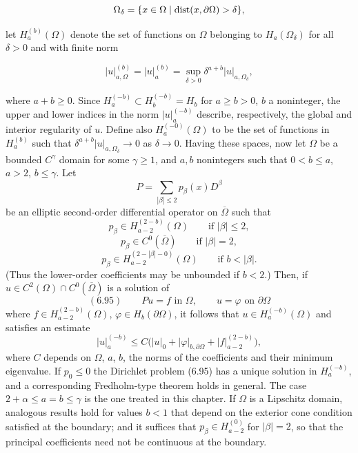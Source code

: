 \[
\Omega_\delta = \{x \in \Omega \mid \operatorname{dist}(x,\partial\Omega) > \delta\},
\]

\noindent let $H_a^{(b)}(\Omega)$ denote the set of functions on $\Omega$ belonging to $H_a(\Omega_\delta)$ for all $\delta > 0$ and with finite norm

\[
|u|_{a,\Omega}^{(b)} = |u|_a^{(b)} = \sup_{\delta>0} \delta^{a+b} |u|_{a,\Omega_\delta},
\]



where $a+b\ge 0$. Since $H_a^{(-b)}\subset H_b^{(-b)}=H_b$ for $a\ge b>0$, $b$ a noninteger, the upper and lower indices in the norm $|u|_a^{(-b)}$ describe, respectively, the global and interior regularity of $u$. Define also $H_a^{(-0)}(\Omega)$ to be the set of functions in $H_a^{(b)}$ such that $\delta^{a+b}|u|_{a,\Omega_\delta}\to 0$ as $\delta\to 0$. Having these spaces, now let $\Omega$ be a bounded $C^\gamma$ domain for some $\gamma\ge 1$, and $a,b$ nonintegers such that $0<b\le a$, $a>2$, $b\le\gamma$.
Let
\[
P=\sum_{|\beta|\le 2} p_\beta(x)D^\beta
\]
be an elliptic second-order differential operator on $\overline{\Omega}$ such that
\[
p_\beta\in H_{a-2}^{(2-b)}(\Omega) \qquad \text{if }|\beta|\le 2,
\]
\[
p_\beta\in C^0(\overline{\Omega}) \qquad \text{if }|\beta|=2,
\]
\[
p_\beta\in H_{a-2}^{(2-|\beta|-0)}(\Omega) \qquad \text{if }b<|\beta|.
\]
(Thus the lower-order coefficients may be unbounded if $b<2$.) Then, if $u\in C^2(\Omega)\cap C^0(\overline{\Omega})$ is a solution of
\[
(6.95)\qquad Pu=f \text{ in }\Omega,\qquad u=\varphi \text{ on }\partial\Omega
\]
where $f\in H_{a-2}^{(2-b)}(\Omega)$, $\varphi\in H_b(\partial\Omega)$, it follows that $u\in H_a^{(-b)}(\Omega)$ and satisfies an estimate
\[
|u|_a^{(-b)}\le C\bigl(|u|_0+|\varphi|_{b,\partial\Omega}+|f|_{a-2}^{(2-b)}\bigr),
\]
where $C$ depends on $\Omega$, $a$, $b$, the norms of the coefficients and their minimum eigenvalue. If $p_0\le 0$ the Dirichlet problem (6.95) has a unique solution in $H_a^{(-b)}$, and a corresponding Fredholm-type theorem holds in general. The case $2+\alpha\le a=b\le\gamma$ is the one treated in this chapter. If $\Omega$ is a Lipschitz domain, analogous results hold for values $b<1$ that depend on the exterior cone condition satisfied at the boundary; and it suffices that $p_\beta\in H_{a-2}^{(0)}$ for $|\beta|=2$, so that the principal coefficients need not be continuous at the boundary.

